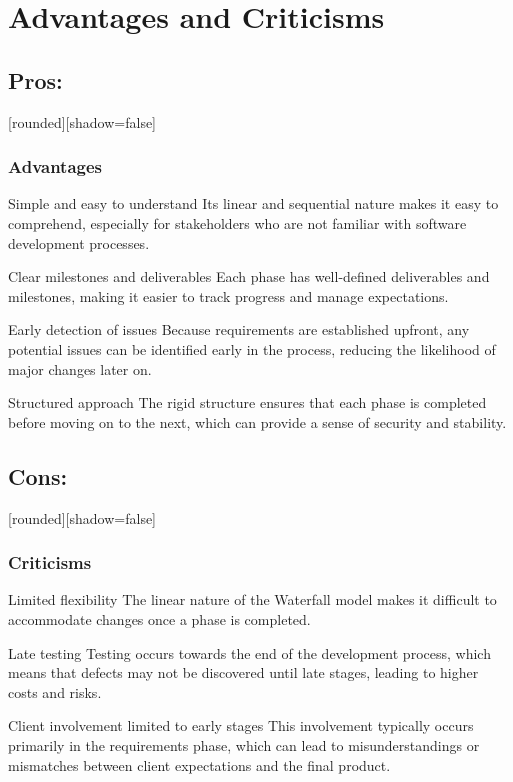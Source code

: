 \documentclass[10pt]{beamer}
\begin{document}

\section{Advantages and Criticisms}
\subsection{Pros:}

\begin{frame}
[rounded][shadow=false]
\frametitle{Advantages}

\begin{block}{Simple and easy to understand}
Its linear and sequential nature makes it easy to comprehend, especially for stakeholders who are not familiar with software development processes.
\end{block}

\begin{block}{Clear milestones and deliverables}
Each phase has well-defined deliverables and milestones, making it easier to track progress and manage expectations.
\end{block}

\begin{block}{Early detection of issues}
Because requirements are established upfront, any potential issues can be identified early in the process, reducing the likelihood of major changes later on.
\end{block}

\begin{block}{Structured approach}
The rigid structure ensures that each phase is completed before moving on to the next, which can provide a sense of security and stability.
\end{block}

\end{frame}

\subsection{Cons:}

\begin{frame}
[rounded][shadow=false]
\frametitle{Criticisms}

\begin{block}{Limited flexibility}
The linear nature of the Waterfall model makes it difficult to accommodate changes once a phase is completed.
\end{block}

\begin{block}{Late testing}
Testing occurs towards the end of the development process, which means that defects may not be discovered until late stages, leading to higher costs and risks.
\end{block}

\begin{block}{Client involvement limited to early stages}
This involvement typically occurs primarily in the requirements phase, which can lead to misunderstandings or mismatches between client expectations and the final product.
\end{block}

\end{frame}
\end{document}
